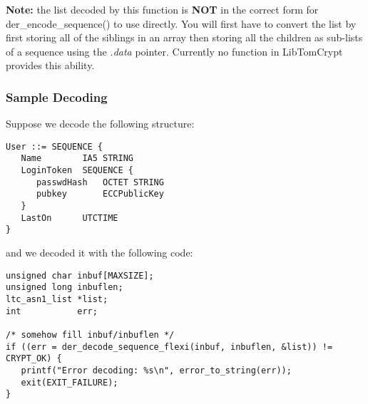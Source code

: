 \documentclass[synpaper]{book}
\begin{document}
\textbf{Note:} the list decoded by this function is \textbf{NOT} in the correct form for der\_encode\_sequence() to use directly.  You will first
have to convert the list by first storing all of the siblings in an array then storing all the children as sub-lists of a sequence using the \textit{.data}
pointer.  Currently no function in LibTomCrypt provides this ability.

\subsubsection{Sample Decoding}
Suppose we decode the following structure:
\begin{small}
\begin{verbatim}
User ::= SEQUENCE {
   Name        IA5 STRING
   LoginToken  SEQUENCE {
      passwdHash   OCTET STRING
      pubkey       ECCPublicKey
   }
   LastOn      UTCTIME
}
\end{verbatim}
\end{small}
\begin{flushleft}and we decoded it with the following code:\end{flushleft}

\begin{small}
\begin{verbatim}
unsigned char inbuf[MAXSIZE];
unsigned long inbuflen;
ltc_asn1_list *list;
int           err;

/* somehow fill inbuf/inbuflen */
if ((err = der_decode_sequence_flexi(inbuf, inbuflen, &list)) != CRYPT_OK) {
   printf("Error decoding: %s\n", error_to_string(err));
   exit(EXIT_FAILURE);
}
\end{verbatim}
\end{small}
\end{document}
